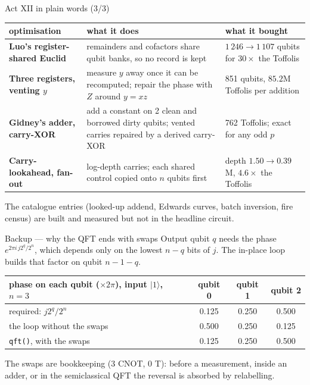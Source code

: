 \documentclass[aspectratio=169,11pt]{beamer}
\begin{document}
\setcounter{framenumber}{208}
\begin{frame}{Act XII in plain words (3/3)}
  \centering\footnotesize
  \renewcommand{\arraystretch}{1.15}
  \begin{tabular}{@{}>{\raggedright}p{30mm}>{\raggedright}p{63mm}>{\raggedright\arraybackslash\leavevmode\color{cverm}}p{40mm}@{}}
    \toprule
    optimisation & what it does & \color{ink}what it bought \\
    \midrule
    \textbf{Luo's register-shared Euclid} & remainders and cofactors share qubit banks, so no record is kept & $1\,246\to1\,107$ qubits for $30\times$ the Toffolis \\
    \textbf{Three registers, venting $y$} & measure $y$ away once it can be recomputed; repair the phase with $Z$ around $y=xz$ & 851 qubits, $85.2$M Toffolis per addition \\
    \textbf{Gidney's adder, carry-XOR} & add a constant on 2 clean and borrowed dirty qubits; vented carries repaired by a derived carry-XOR & 762 Toffolis; exact for any odd $p$ \\
    \textbf{Carry-lookahead, fan-out} & log-depth carries; each shared control copied onto $n$ qubits first & depth $1.50\to0.39$M, $4.6\times$ the Toffolis \\
    \bottomrule
  \end{tabular}
  \par\vskip1mm{\scriptsize\color{subtle}The catalogue entries (looked-up addend, Edwards curves, batch inversion, fire census) are built and measured but not in the headline circuit.}
\end{frame}

\appendix
{}
\begin{frame}{Backup --- why the QFT ends with swaps}
  Output qubit $q$ needs the phase $e^{2\pi i\,j2^q/2^n}$, which depends only on the lowest $n-q$ bits of $j$. The in-place loop builds that factor on qubit $n-1-q$.
  \vskip2mm
  \centering\small
  \begin{tabular}{lccc}
    \toprule
    phase on each qubit ($\times2\pi$), input $|1\rangle$, $n=3$ & qubit 0 & qubit 1 & qubit 2 \\
    \midrule
    required: $j2^q/2^n$ & 0.125 & 0.250 & 0.500 \\
    the loop without the swaps & 0.500 & 0.250 & 0.125 \\
    \texttt{qft()}, with the swaps & 0.125 & 0.250 & 0.500 \\
    \bottomrule
  \end{tabular}
  \vskip2mm
  \raggedright
  \begin{takeaway}The swaps are bookkeeping (3 CNOT, 0 T): before a measurement, inside an adder, or in the semiclassical QFT the reversal is absorbed by relabelling.\end{takeaway}
\end{frame}
\end{document}
